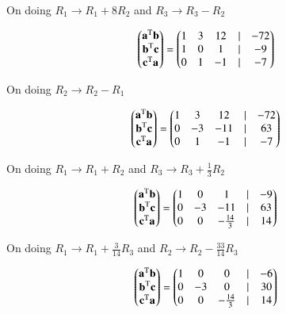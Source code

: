 \documentclass{beamer}
\begin{document}
\begin{frame}
On doing $R_1\rightarrow R_1+8R_2$ and $R_3\rightarrow R_3-R_2$

\begin{align}
    \begin{pmatrix}\textbf{a}^\text{T}\textbf{b}\\\textbf{b}^\text{T}\textbf{c}\\\textbf{c}^\text{T}\textbf{a}\\\end{pmatrix}=\begin{pmatrix}1 & 3 & 12 &| & -72\\1& 0 & 1 & | &-9\\0&1&-1&|&-7\end{pmatrix}
    \label{0.11}
\end{align}

On doing $R_2\rightarrow R_2-R_1$

\begin{align}
    \begin{pmatrix}\textbf{a}^\text{T}\textbf{b}\\\textbf{b}^\text{T}\textbf{c}\\\textbf{c}^\text{T}\textbf{a}\\\end{pmatrix}=\begin{pmatrix}1 & 3 & 12 &| & -72\\0& -3 & -11 & | &63\\0&1&-1&|&-7\end{pmatrix}
    \label{0.12}
\end{align}
\end{frame}
\begin{frame}
On doing $R_1 \rightarrow R_1 + R_2$ and $R_3 \rightarrow R_3+\frac{1}{3}R_2$

\begin{align}
    \begin{pmatrix}\textbf{a}^\text{T}\textbf{b}\\\textbf{b}^\text{T}\textbf{c}\\\textbf{c}^\text{T}\textbf{a}\\\end{pmatrix}=\begin{pmatrix}1 & 0 & 1 &| & -9\\0& -3 & -11 & | &63\\0&0&-\frac{14}{3}&|&14\end{pmatrix}
    \label{0.13}
\end{align}

On doing $R_1\rightarrow R_1+\frac{3}{14}R_3$ and $R_2\rightarrow R_2-\frac{33}{14}R_3$

\begin{align}
    \begin{pmatrix}\textbf{a}^\text{T}\textbf{b}\\\textbf{b}^\text{T}\textbf{c}\\\textbf{c}^\text{T}\textbf{a}\\\end{pmatrix}=\begin{pmatrix}1 & 0 & 0 &| & -6\\0& -3 & 0 & | &30\\0&0&-\frac{14}{3}&|&14\end{pmatrix}
    \label{0.14}
\end{align}

\end{frame}
\end{document}
